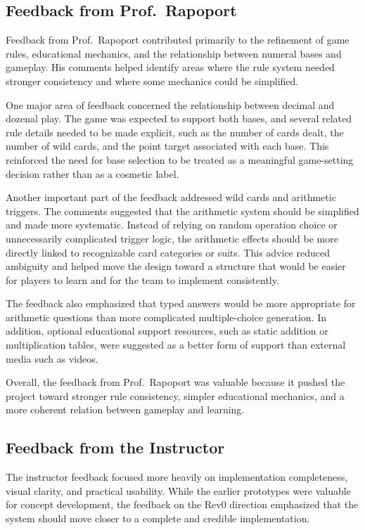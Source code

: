 \documentclass[12pt]{article}
\begin{document}
    \subsection{Feedback from Prof.\ Rapoport}

    Feedback from Prof.\ Rapoport contributed primarily to the refinement of game rules, educational mechanics, and the relationship between numeral bases and gameplay. His comments helped identify areas where the rule system needed stronger consistency and where some mechanics could be simplified.

    One major area of feedback concerned the relationship between decimal and dozenal play. The game was expected to support both bases, and several related rule details needed to be made explicit, such as the number of cards dealt, the number of wild cards, and the point target associated with each base. This reinforced the need for base selection to be treated as a meaningful game-setting decision rather than as a cosmetic label.

    Another important part of the feedback addressed wild cards and arithmetic triggers. The comments suggested that the arithmetic system should be simplified and made more systematic. Instead of relying on random operation choice or unnecessarily complicated trigger logic, the arithmetic effects should be more directly linked to recognizable card categories or suits. This advice reduced ambiguity and helped move the design toward a structure that would be easier for players to learn and for the team to implement consistently.

    The feedback also emphasized that typed answers would be more appropriate for arithmetic questions than more complicated multiple-choice generation. In addition, optional educational support resources, such as static addition or multiplication tables, were suggested as a better form of support than external media such as videos.

    Overall, the feedback from Prof.\ Rapoport was valuable because it pushed the project toward stronger rule consistency, simpler educational mechanics, and a more coherent relation between gameplay and learning.

    \subsection{Feedback from the Instructor}

    The instructor feedback focused more heavily on implementation completeness, visual clarity, and practical usability. While the earlier prototypes were valuable for concept development, the feedback on the Rev0 direction emphasized that the system should move closer to a complete and credible implementation.
\end{document}
